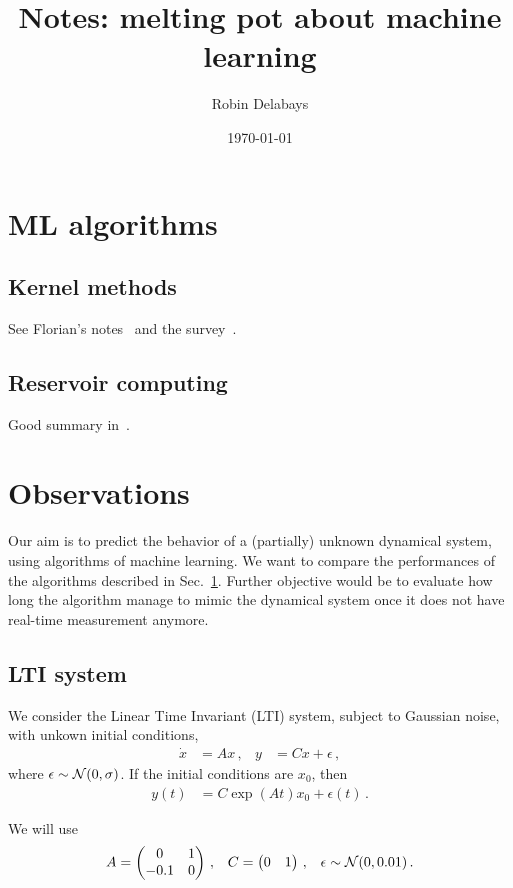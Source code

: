 \documentclass{article}
\begin{document}
\title{Notes: melting pot about machine learning}
\author{Robin Delabays}
\date{\today}

\maketitle

\section{ML algorithms}\label{sec:ml_algo}

\subsection{Kernel methods}
See Florian's notes~\cite{Florian} and the survey~\cite{Pil14}. 

\subsection{Reservoir computing}
Good summary in~\cite{Lu17}.

\section{Observations}
Our aim is to predict the behavior of a (partially) unknown dynamical system, using algorithms of machine learning. 
We want to compare the performances of the algorithms described in Sec.~\ref{sec:ml_algo}. 
Further objective would be to evaluate how long the algorithm manage to mimic the dynamical system once it does not have real-time measurement anymore.

\subsection{LTI system}
We consider the Linear Time Invariant (LTI) system, subject to Gaussian noise, with unkown initial conditions,  
\begin{align}\label{eq:lti}
 \dot{x} &= Ax\, , & y &= Cx + \epsilon\, ,
\end{align}
where $\epsilon\sim{\cal N}(0,\sigma)$. 
If the initial conditions are $x_0$, then 
\begin{align}
 y(t) &= C\exp(At)x_0+\epsilon(t)\, .
\end{align}

We will use 
\begin{align}\label{eq:lti_params}
 A &=
 \begin{pmatrix}
  0 & 1 \\
  -0.1 & 0
 \end{pmatrix}\, ,
 & C &= 
 \begin{pmatrix}
  0 & 1
 \end{pmatrix}\, ,
 & \epsilon\sim{\cal N}(0,0.01)\, .
\end{align}
\end{document}
